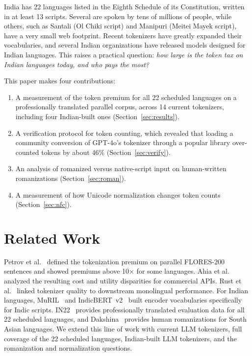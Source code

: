 \documentclass[conference]{IEEEtran}
\begin{document}
India has 22 languages listed in the Eighth Schedule of its Constitution, written in at least 13 scripts. Several are spoken by tens of millions of people, while others, such as Santali (Ol Chiki script) and Manipuri (Meitei Mayek script), have a very small web footprint. Recent tokenizers have greatly expanded their vocabularies, and several Indian organizations have released models designed for Indian languages. This raises a practical question: \emph{how large is the token tax on Indian languages today, and who pays the most?}

This paper makes four contributions:
\begin{enumerate}
\item A measurement of the token premium for all 22 scheduled languages on a professionally translated parallel corpus, across 14 current tokenizers, including four Indian-built ones (Section~\ref{sec:results}).
\item A verification protocol for token counting, which revealed that loading a community conversion of GPT-4o's tokenizer through a popular library over-counted tokens by about 46\% (Section~\ref{sec:verify}).
\item An analysis of romanized versus native-script input on human-written romanizations (Section~\ref{sec:roman}).
\item A measurement of how Unicode normalization changes token counts (Section~\ref{sec:nfc}).
\end{enumerate}

\section{Related Work}
Petrov et al.~\cite{petrov2023} defined the tokenization premium on parallel FLORES-200 sentences and showed premiums above 10$\times$ for some languages. Ahia et al.~\cite{ahia2023} analyzed the resulting cost and utility disparities for commercial APIs. Rust et al.~\cite{rust2021} linked tokenizer quality to downstream monolingual performance. For Indian languages, MuRIL~\cite{khanuja2021} and IndicBERT~v2~\cite{doddapaneni2023} built encoder vocabularies specifically for Indic scripts. IN22~\cite{gala2023} provides professionally translated evaluation data for all 22 scheduled languages, and Dakshina~\cite{roark2020} provides human romanizations for South Asian languages. We extend this line of work with current LLM tokenizers, full coverage of the 22 scheduled languages, Indian-built LLM tokenizers, and the romanization and normalization questions.
\end{document}
